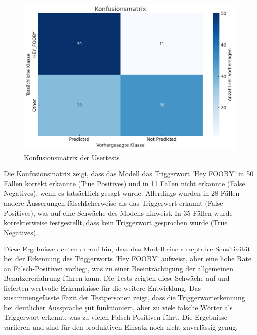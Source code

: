 \documentclass[11pt,a4paper]{article}
\begin{document}
\begin{figure}[H]
	\centering
	\includegraphics[width=0.8\linewidth]{img/eval-usertests.png}
	\caption{Konfusionsmatrix der Usertests}
	\label{fig:usertests}
\end{figure}

\noindent \newline
Die Konfusionsmatrix zeigt, dass das Modell das Triggerwort 'Hey FOOBY' in 50 Fällen korrekt 
erkannte (True Positives) und in 11 Fällen nicht erkannte (False Negatives), wenn es tatsächlich 
gesagt wurde. Allerdings wurden in 28 Fällen andere Äusserungen fälschlicherweise als das 
Triggerwort erkannt (False Positives), was auf eine Schwäche des Modells hinweist. In 35 Fällen 
wurde korrekterweise festgestellt, dass kein Triggerwort gesprochen wurde (True Negatives).


\noindent \newline
Diese Ergebnisse deuten darauf hin, dass das Modell eine akzeptable Sensitivität bei der Erkennung 
des Triggerworts 'Hey FOOBY' aufweist, aber eine hohe Rate an Falsch-Positiven vorliegt, was zu 
einer Beeinträchtigung der allgemeinen Benutzererfahrung führen kann. Die Tests zeigten diese 
Schwäche auf und lieferten wertvolle Erkenntnisse für die weitere Entwicklung. 
Das zusammengefasste Fazit der Testpersonen zeigt, dass die Triggerworterkennung bei deutlicher 
Aussprache 
gut funktioniert, aber zu viele falsche Wörter als Triggerwort erkennt, was zu vielen 
Falsch-Positiven führt. Die Ergebnisse variieren und sind für den produktiven Einsatz noch nicht 
zuverlässig genug.
\end{document}
